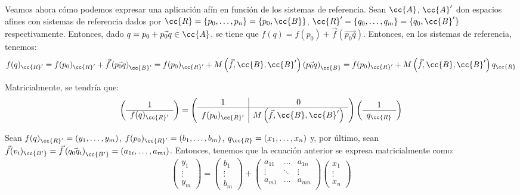 Veamos ahora cómo podemos expresar una aplicación afín en función de los sistemas de referencia. Sean $\cc{A}$, $\cc{A}'$ don espacios afines con sistemas de referencia dados por $\cc{R}=\{p_0,\dots,p_n\}=\{p_0,\cc{B}\}$, $\cc{R}'=\{q_0,\dots,q_m\}=\{q_0,\cc{B}'\}$ respectivamente. Entonces, dado $q=p_0+\vec{p_0q}\in \cc{A}$, se tiene que $f(q)=f(p_0)+\vec{f}(\vec{p_0q})$. Entonces, en los sistemas de referencia, tenemos:
\begin{equation*}
    f(q)_{\cc{R}'} = f(p_0)_{\cc{R}'} + \vec{f}\left(\vec{p_0q}\right)_{\cc{B}'}
    = f(p_0)_{\cc{R}'} + M\left(\vec{f},\cc{B},\cc{B}'\right)\left(\vec{p_0q}\right)_{\cc{B}}
    = f(p_0)_{\cc{R}'} + M\left(\vec{f},\cc{B},\cc{B}'\right)q_{\cc{R}}
\end{equation*}

Matricialmente, se tendría que:
\begin{equation*}
    \left(\begin{array}{c}
        1 \\ \hline
        f(q)_{\cc{R}'} 
    \end{array}\right)
    = \left(\begin{array}{c|c}
        1 & 0 \\ \hline
        f(p_0)_{\cc{R}'} &  M\left(\vec{f},\cc{B},\cc{B}'\right)  \\
    \end{array}\right)
    \left(\begin{array}{c}
        1\\ \hline
        q_{\cc{R}}
    \end{array}\right)
\end{equation*}

Sean $f(q)_{\cc{R}'}=(y_1,\dots,y_m)$, $f(p_0)_{\cc{R}'}=(b_1,\dots,b_m)$, $q_{\cc{R}}=(x_1,\dots,x_n)$ y, por último, sean $\vec{f}(v_i)_{\cc{B'}}=\vec{f}\left(\vec{q_0q_i}\right)_{\cc{B'}}=(a_{1i}, \dots, a_{mi})$. Entonces, tenemos que la ecuación anterior se expresa matricialmente como:
\begin{equation*}
    \left(\begin{array}{c}
        y_1\\ \vdots \\ y_m
    \end{array}\right)
    = 
    \left(\begin{array}{c}
        b_1\\ \vdots \\ b_m
    \end{array}\right)
    +
    \left(\begin{array}{ccc}
        a_{11} & \dots & a_{1n}\\
        \vdots & \ddots & \vdots \\
        a_{m1} & \dots & a_{mn}\\
    \end{array}\right)
    \left(\begin{array}{c}
        x_1\\ \vdots \\ x_n
    \end{array}\right)
\end{equation*}

